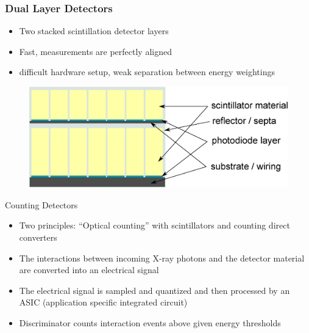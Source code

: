 \begin{frame}
    \frametitle{Dual Layer Detectors}
    \begin{itemize}
        \item Two stacked scintillation detector layers
        \item {} Fast, measurements are perfectly aligned
        \item {} difficult hardware setup, weak separation between energy weightings
    \end{itemize}
    \begin{figure}
        \centering{}
        \includegraphics[height=0.6\textheight]{images/duall.eps}
    \end{figure}
\end{frame}

\begin{frame}[c]{Counting Detectors}
    \begin{itemize}
        \setlength\itemsep{0.4cm}

        \item Two principles: ``Optical counting'' with scintillators and counting direct converters
        \item The interactions between incoming X-ray photons and the detector material are converted into an electrical signal
        \item The electrical signal is sampled and quantized and then processed by an ASIC (application specific integrated circuit)
        \item Discriminator counts interaction events above given energy thresholds
    \end{itemize}
\end{frame}

